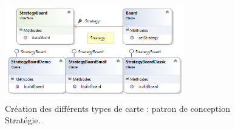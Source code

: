 		
		\begin{figure}
			\begin{center}
				\includegraphics[width=0.7\textwidth]{figure/strategy.png}
			\end{center}
			\caption{Création des différents types de carte : patron de conception Stratégie.}
			\label{fig:strategy}
		\end{figure}






